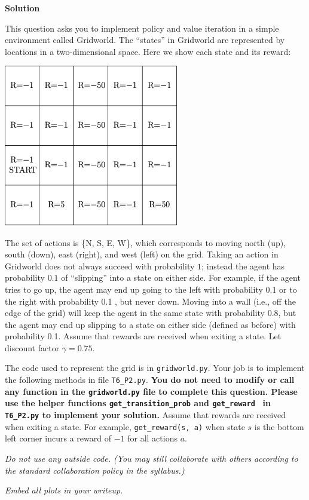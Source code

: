 \documentclass[submit]{harvardml}
\begin{document}
\textbf{Solution}

\begin{problem}

This question asks you to implement policy and value iteration in a
simple environment called Gridworld.  The ``states'' in Gridworld are
represented by locations in a two-dimensional space.  Here we show each state and its reward:

\begin{center}
\includegraphics[width=3in]{gridworld.png}
\end{center}

The set of actions is \{N, S, E, W\}, which corresponds to moving
north (up), south (down), east (right), and west (left) on the grid.
Taking an action in Gridworld does not always succeed with probability
$1$; instead the agent has probability $0.1$ of ``slipping'' into a
state on either side.  For example, if the agent tries to go up, the
agent may end up going to the left with probability 0.1 or
to the right
 with probability 0.1 , but never down.  Moving into a wall
(i.e., off the edge of the grid) will keep the agent in the same state
with probability  0.8, but
the agent may end up slipping to a state on either side (defined as before) with probability 0.1.  Assume that rewards are received when exiting a state. Let discount factor $\gamma = 0.75$.

The code used to represent the grid is in \texttt{gridworld.py}.  Your job is to implement the following methods in file \texttt{T6\_P2.py}. \textbf{You do not need to modify or call any function in the \texttt{gridworld.py} file to complete this question.  Please use the helper functions \texttt{get\_transition\_prob} and \texttt{get\_reward } in \texttt{T6\_P2.py} to implement your solution.} Assume that rewards are received when exiting a state.  For example, \texttt{get\_reward(s, a)} when state $s$ is the bottom left corner incurs a reward of $-1$ for all actions $a$.

\emph{Do not use any outside code.  (You may still collaborate with others according to the standard collaboration policy in the syllabus.)}  

\emph{Embed all plots in your writeup.}

\end{problem}
\newpage
\end{document}
